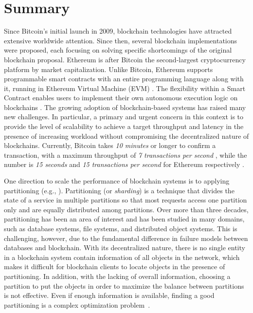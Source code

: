 \newpage
\section{Summary}
Since Bitcoin's initial launch in 2009, blockchain technologies have attracted
extensive worldwide attention. Since then, several blockchain implementations
were proposed, each focusing on solving specific shortcomings of the original
blockchain proposal. Ethereum is after Bitcoin the second-largest cryptocurrency
platform by market capitalization. Unlike Bitcoin, Ethereum supports programmable
smart contracts with an entire programming language along with it, running in
Ethereum Virtual Machine (EVM) \cite{ethereum:evm}. The flexibility within a
Smart Contract enables users to implement their own autonomous execution logic
on blockchains \cite{delmolino2016step, buterin2014next, kosba2016hawk}. The
growing adoption of blockchain-based systems has raised many new challenges. In
particular, a primary and urgent concern in this context is to provide the level
of scalability to achieve a target throughput and latency in the presence of
increasing workload without compromising the decentralized nature of
blockchains. Currently, Bitcoin takes \emph{10 minutes} or longer to confirm a transaction,
with a maximum throughput of \emph{7 transactions per second}
\cite{nakamoto2019bitcoin}, while the number is \emph{15 seconds} and \emph{15
transactions per second} for Ethereum respectively \cite{ethereum:sharding}. 

One direction to scale the performance of blockchain systems is to applying
partitioning (e.g., \cite{facebookTAO, sciascia2012sdur, aguilera2007sinfonia}).
Partitioning (or \emph{sharding}) is a technique that divides the state of a
service in multiple partitions so that most requests access one partition only
and are equally distributed among partitions. Over more than three decades,
partitioning has been an area of interest and has been studied in many domains,
such as database systems, file systems, and distributed object systems. This is
challenging, however, due to the fundamental difference in failure models
between databases and blockchain. With its decentralized nature, there is no
single entity in a blockchain system contain information of all objects in the
network, which makes it difficult for blockchain clients to locate objects in
the presence of partitioning. In addition, with the lacking of overall
information, choosing a partition to put the objects in order to maximize the
balance between partitions is not effective. Even if enough information is
available, finding a good partitioning is a complex optimization
problem~\cite{curino2010sch,taft2014est}.

